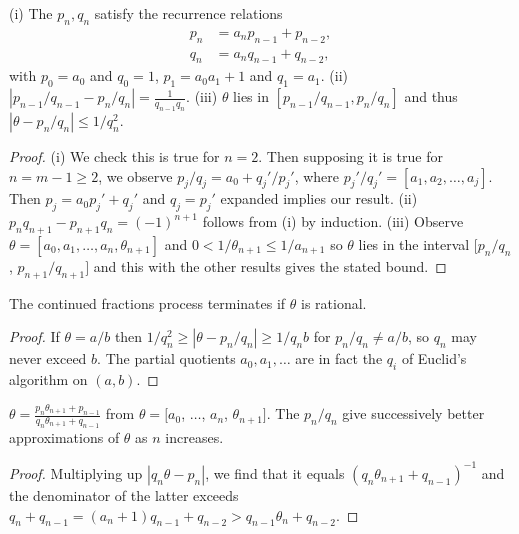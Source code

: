\documentclass[a4paper, 10pt, twocolumn]{amsart}
\begin{document}
\begin{theorem}
    (i) The $p_n, q_n$ satisfy the recurrence relations
    \begin{align*}
        p_n &= a_n p_{n-1} + p_{n-2}, \\
        q_n &= a_n q_{n - 1} + q_{n-2},
    \end{align*}
    with $p_0 = a_0$ and $q_0 = 1$, $p_1 = a_0 a_1 + 1$ and $q_1 = a_1$. 
    (ii) $|p_{n-1}/q_{n-1} - p_n/q_n| = \frac{1}{q_{n - 1}q_n}$. (iii) $\theta$ lies in $[p_{n-1}/q_{n-1}, p_n/q_n]$ and thus $|\theta - p_n/q_n| \leq 1/q_n^2$.
\end{theorem}
\begin{proof}
    (i) We check this is true for $n = 2$.
    Then supposing it is true for $n = m - 1 \geq 2$, we observe $p_j/q_j = a_0 + q_j'/p_j'$, where $p_j'/q_j' = [a_1, a_2, \dots, a_j]$. Then $p_j = a_0 p_j' + q_j'$ and $q_j = p_j'$ expanded implies our result. (ii) $p_n q_{n +1} - p_{n+1}q_n = (-1)^{n + 1}$ follows from (i) by induction.
    (iii) Observe $\theta = [a_0, a_1, \dots, a_n, \theta_{n + 1}]$ and $0 < 1/\theta_{n + 1} \leq 1/a_{n + 1}$ so $\theta$ lies in the interval $[p_n/q_n$, $p_{n +1}/q_{n+1}]$ and this with the other results gives the stated bound.
\end{proof}

\begin{theorem}
    The continued fractions process terminates if $\theta$ is rational.
\end{theorem}
\begin{proof}
    If $\theta = a/b$ then $1/q_n^2 \geq |\theta - p_n/q_n| \geq 1/q_n b$ for $p_n/q_n \neq a/b$, so $q_n$ may never exceed $b$. The partial quotients $a_0, a_1, \dots$ are in fact the $q_i$ of Euclid's algorithm on $(a, b)$.
\end{proof}

\begin{theorem}
$\theta = \frac{p_n \theta_{n + 1} + p_{n - 1}}{q_n \theta_{n + 1} + q_{n - 1}}$ from $\theta = [a_0$, $\dots$, $a_n$, $\theta_{n + 1}]$. The $p_n/q_n$ give successively better approximations of $\theta$ as $n$ increases.  
\end{theorem}
\begin{proof}
  Multiplying up $|q_n \theta - p_n|$, we find that it equals $(q_n \theta_{n + 1}+q_{n - 1})^{-1}$ and the denominator of the latter exceeds $q_n + q_{n - 1} = (a_n + 1)q_{n - 1} + q_{n - 2} > q_{n - 1} \theta_n + q_{n - 2}$.
\end{proof}
\end{document}
